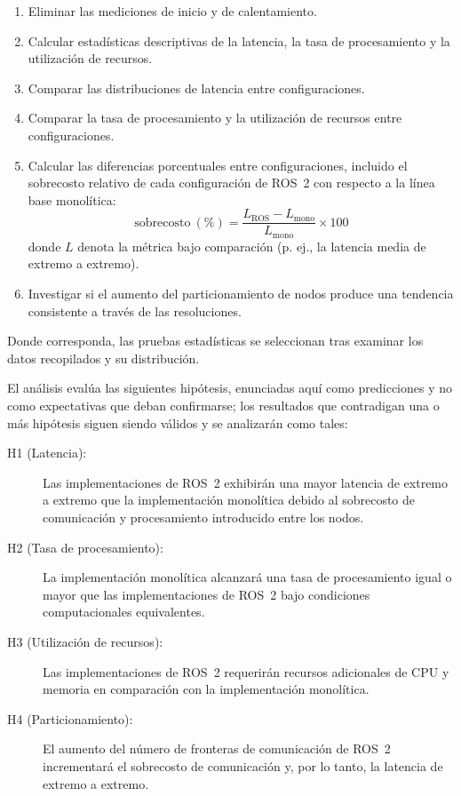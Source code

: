 \begin{enumerate}
  \item Eliminar las mediciones de inicio y de calentamiento.
  \item Calcular estadísticas descriptivas de la latencia, la tasa de
        procesamiento y la utilización de recursos.
  \item Comparar las distribuciones de latencia entre configuraciones.
  \item Comparar la tasa de procesamiento y la utilización de recursos
        entre configuraciones.
  \item Calcular las diferencias porcentuales entre configuraciones,
        incluido el sobrecosto relativo de cada configuración de ROS~2 con
        respecto a la línea base monolítica:
        \begin{equation}
          \mathrm{sobrecosto}\ (\%) = \frac{L_{\mathrm{ROS}} -
          L_{\mathrm{mono}}}{L_{\mathrm{mono}}} \times 100
          \label{eq:overhead}
        \end{equation}
        donde $L$ denota la métrica bajo comparación (p. ej., la latencia
        media de extremo a extremo).
  \item Investigar si el aumento del particionamiento de nodos produce una
        tendencia consistente a través de las resoluciones.
\end{enumerate}

Donde corresponda, las pruebas estadísticas se seleccionan tras examinar los
datos recopilados y su distribución.

El análisis evalúa las siguientes hipótesis, enunciadas aquí como
predicciones y no como expectativas que deban confirmarse; los resultados
que contradigan una o más hipótesis siguen siendo válidos y se analizarán
como tales:

\begin{description}
  \item[H1 (Latencia):] Las implementaciones de ROS~2 exhibirán una mayor
        latencia de extremo a extremo que la implementación monolítica
        debido al sobrecosto de comunicación y procesamiento introducido
        entre los nodos.
  \item[H2 (Tasa de procesamiento):] La implementación monolítica
        alcanzará una tasa de procesamiento igual o mayor que las
        implementaciones de ROS~2 bajo condiciones computacionales
        equivalentes.
  \item[H3 (Utilización de recursos):] Las implementaciones de ROS~2
        requerirán recursos adicionales de CPU y memoria en comparación
        con la implementación monolítica.
  \item[H4 (Particionamiento):] El aumento del número de fronteras de
        comunicación de ROS~2 incrementará el sobrecosto de comunicación
        y, por lo tanto, la latencia de extremo a extremo.
\end{description}


